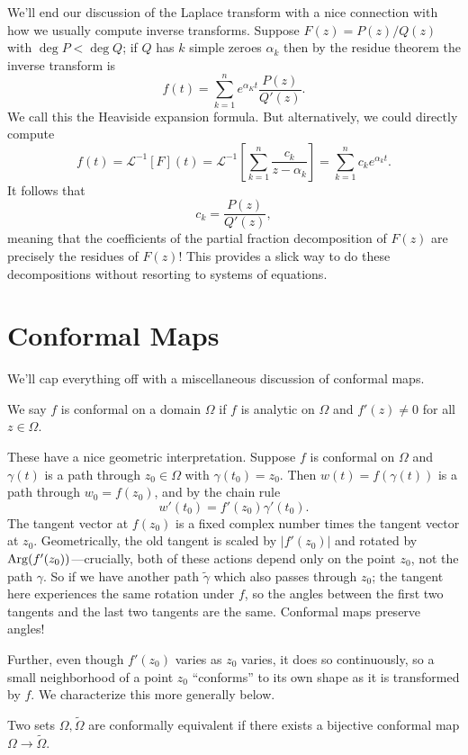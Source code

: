 \documentclass[../m136main.tex]{subfiles}
\begin{document}
We'll end our discussion of the Laplace transform with a nice connection with how we usually compute inverse transforms.
Suppose $F(z) = P(z) / Q(z)$ with $\deg P < \deg Q$; if $Q$ has $k$ simple zeroes $\alpha_k$ then by the residue theorem the inverse transform is
\[ f(t) = \sum_{k=1}^{n} e^{\alpha_K t} \frac{P(z)}{Q'(z)}. \]
We call this the Heaviside expansion formula.
But alternatively, we could directly compute
\[ f(t) = \mathcal L^{-1}[F](t) = \mathcal L^{-1} \left[ \sum_{k=1}^{n} \frac{c_k}{z - \alpha_k} \right] = \sum_{k=1}^{n} c_k e^{\alpha_k t}. \]
It follows that
\[ c_k = \frac{P(z)}{Q'(z)}, \]
meaning that the coefficients of the partial fraction decomposition of $F(z)$ are precisely the residues of $F(z)$!
This provides a slick way to do these decompositions without resorting to systems of equations.

\section{Conformal Maps}
We'll cap everything off with a miscellaneous discussion of conformal maps.

\begin{definition}
    We say $f$ is conformal on a domain $\Omega$ if $f$ is analytic on $\Omega$ and $f'(z) \neq 0$ for all $z \in \Omega$.
\end{definition}

These have a nice geometric interpretation.
Suppose $f$ is conformal on $\Omega$ and $\gamma(t)$ is a path through $z_0 \in \Omega$ with $\gamma(t_0) = z_0$.
Then $w(t) = f(\gamma(t))$ is a path through $w_0 = f(z_0)$, and by the chain rule
\[ w'(t_0) = f'(z_0) \gamma'(t_0). \]
The tangent vector at $f(z_0)$ is a fixed complex number times the tangent vector at $z_0$.
Geometrically, the old tangent is scaled by $|f'(z_0)|$ and rotated by $\operatorname{Arg}(f'(z_0))$---crucially, both of these actions depend only on the point $z_0$, not the path $\gamma$.
So if we have another path $\tilde \gamma$ which also passes through $z_0$; the tangent here experiences the same rotation under $f$, so the angles between the first two tangents and the last two tangents are the same.
Conformal maps preserve angles!

Further, even though $f'(z_0)$ varies as $z_0$ varies, it does so continuously, so a small neighborhood of a point $z_0$ ``conforms'' to its own shape as it is transformed by $f$.
We characterize this more generally below.

\begin{definition}
    Two sets $\Omega, \tilde \Omega$ are conformally equivalent if there exists a bijective conformal map $\Omega \to \tilde \Omega$.
\end{definition}
\end{document}
